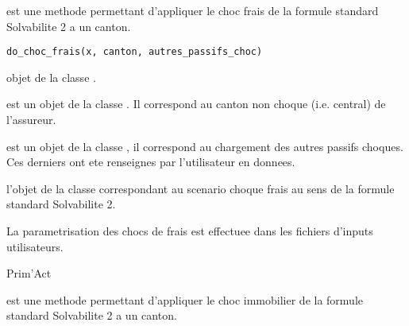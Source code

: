 \documentclass[a4paper]{book}
\begin{document}
%
\begin{Description}\relax
{} est une methode permettant d'appliquer le choc frais de la formule standard Solvabilite 2
a un canton.
\end{Description}
%
\begin{Usage}
\begin{verbatim}
do_choc_frais(x, canton, autres_passifs_choc)
\end{verbatim}
\end{Usage}
%
\begin{Arguments}
\begin{ldescription}
\item[\code{x}] objet de la classe .

\item[\code{canton}] est un objet de la classe . Il correspond au canton non choque (i.e. central)
de l'assureur.

\item[\code{autres\_passifs\_choc}] est un objet de la classe , il correspond au chargement
des autres passifs choques.
Ces derniers ont ete renseignes par l'utilisateur en donnees.
\end{ldescription}
\end{Arguments}
%
\begin{Value}
 l'objet  de la classe  correspondant au scenario choque frais
au sens de la formule standard Solvabilite 2.
\end{Value}
%
\begin{Note}\relax
La parametrisation des chocs de frais est effectuee dans les fichiers d'inputs utilisateurs.
\end{Note}
%
\begin{Author}\relax
Prim'Act
\end{Author}
%
\begin{Description}\relax
{} est une methode permettant d'appliquer le choc immobilier de la formule standard Solvabilite 2
a un canton.
\end{Description}
\end{document}

